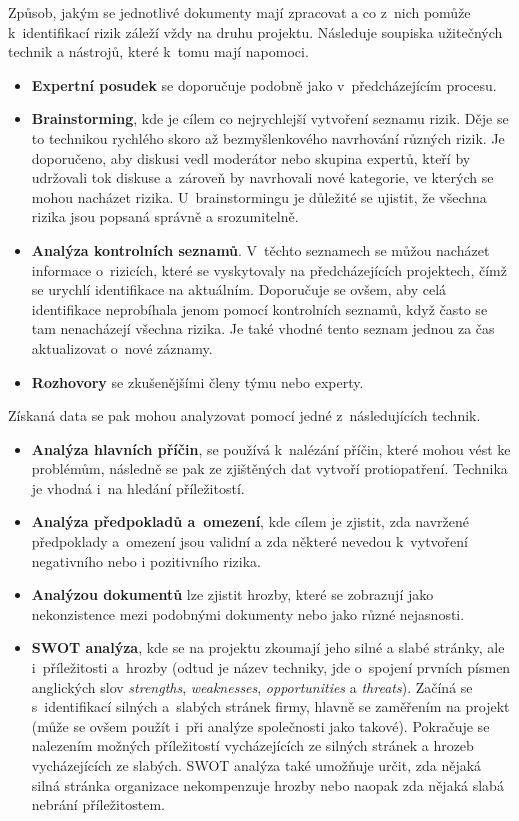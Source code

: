 Způsob, jakým se jednotlivé dokumenty mají zpracovat a co z~nich pomůže k~identifikací rizik záleží vždy na druhu projektu. Následuje soupiska užitečných technik a nástrojů, které k~tomu mají napomoci.
\begin{itemize}
    \item \textbf{Expertní posudek} se doporučuje podobně jako v~předcházejícím procesu. 
    \item \textbf{Brainstorming}, kde je cílem co nejrychlejší vytvoření seznamu rizik. Děje se to technikou rychlého skoro až bezmyšlenkového navrhování různých rizik. Je doporučeno, aby diskusi vedl moderátor nebo skupina expertů, kteří by udržovali tok diskuse a~zároveň by navrhovali nové kategorie, ve kterých se mohou nacházet rizika. U~brainstormingu je důležité se ujistit, že všechna rizika jsou popsaná správně a srozumitelně.
    \item \textbf{Analýza kontrolních seznamů}. V~těchto seznamech se můžou nacházet informace o~rizicích, které se vyskytovaly na předcházejících projektech, čímž se urychlí identifikace na aktuálním. Doporučuje se ovšem, aby celá identifikace neprobíhala jenom pomocí kontrolních seznamů, když často se tam nenacházejí všechna rizika. Je také vhodné tento seznam jednou za čas aktualizovat o~nové záznamy.
    \item \textbf{Rozhovory} se zkušenějšími členy týmu nebo experty. 
\end{itemize}
 
 Získaná data se pak mohou analyzovat pomocí jedné z~následujících technik.
 
 \begin{itemize}
     \item \textbf{Analýza hlavních příčin}, se používá k~nalézání příčin, které mohou vést ke problémům, následně se pak ze zjištěných dat vytvoří protiopatření. Technika je vhodná i~na hledání příležitostí.
     \item \textbf{Analýza předpokladů a~omezení}, kde cílem je zjistit, zda navržené předpoklady a~omezení jsou validní a zda některé nevedou k~vytvoření negativního nebo i pozitivního rizika.
     \item \textbf{Analýzou dokumentů} lze zjistit hrozby, které se zobrazují jako nekonzistence mezi podobnými dokumenty nebo jako různé nejasnosti. 
     \item \textbf{SWOT analýza}, kde se na projektu zkoumají jeho silné a slabé stránky, ale i~příležitosti a~hrozby (odtud je název techniky, jde o~spojení prvních písmen anglických slov \textit{strengths}, \textit{weaknesses}, \textit{opportunities} a \textit{threats}). Začíná se s~identifikací silných a~slabých stránek firmy, hlavně se zaměřením na projekt (může se ovšem použít i~při analýze společnosti jako takové). Pokračuje se nalezením možných příležitostí vycházejících ze silných stránek a hrozeb vycházejících ze slabých. SWOT analýza také umožňuje určit, zda nějaká silná stránka organizace nekompenzuje hrozby nebo naopak zda nějaká slabá nebrání příležitostem.
 \end{itemize}
 
